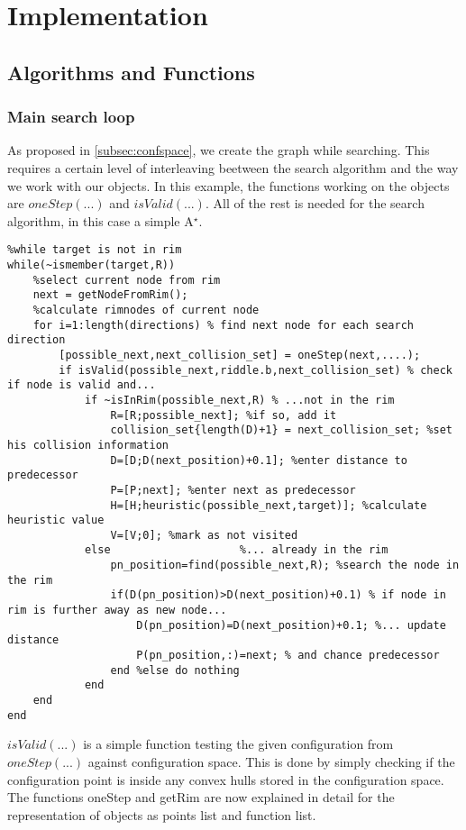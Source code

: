 \chapter{Implementation}
\label{cha:Implementation}

\section{Algorithms and Functions}
\subsection{Main search loop}
As proposed in \ref{subsec:confspace}, we create the graph while searching. This requires a certain level of interleaving beetween the search algorithm and the way we work with our objects. In this example, the functions working on the objects are $oneStep(...)$ and $isValid(...)$. All of the rest is needed for the search algorithm, in this case a simple A$^\star$.

\begin{lstlisting}
%while target is not in rim
while(~ismember(target,R))
    %select current node from rim
    next = getNodeFromRim();  
    %calculate rimnodes of current node 
    for i=1:length(directions) % find next node for each search direction
        [possible_next,next_collision_set] = oneStep(next,....); 
        if isValid(possible_next,riddle.b,next_collision_set) % check if node is valid and...
            if ~isInRim(possible_next,R) % ...not in the rim
                R=[R;possible_next]; %if so, add it
                collision_set{length(D)+1} = next_collision_set; %set his collision information
                D=[D;D(next_position)+0.1]; %enter distance to predecessor
                P=[P;next]; %enter next as predecessor
                H=[H;heuristic(possible_next,target)]; %calculate heuristic value
                V=[V;0]; %mark as not visited
            else                    %... already in the rim
                pn_position=find(possible_next,R); %search the node in the rim
                if(D(pn_position)>D(next_position)+0.1) % if node in rim is further away as new node...
                    D(pn_position)=D(next_position)+0.1; %... update distance
                    P(pn_position,:)=next; % and chance predecessor
                end %else do nothing
            end
    end  
end
\end{lstlisting}

$isValid(...)$ is a simple function testing the given configuration from $oneStep(...)$ against configuration space. This is done by simply checking if the configuration point is inside any convex hulls stored in the configuration space.\\
The functions oneStep and getRim are now explained in detail for the representation of objects as points list and function list.
